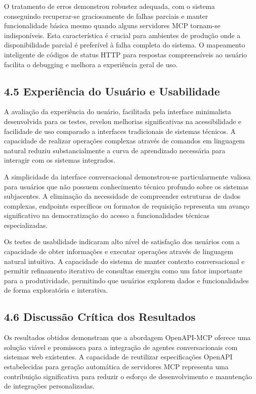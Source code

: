 \documentclass[
]{article}
\begin{document}
O tratamento de erros demonstrou robustez adequada, com o sistema
conseguindo recuperar-se graciosamente de falhas parciais e manter
funcionalidade básica mesmo quando alguns servidores MCP tornam-se
indisponíveis. Esta característica é crucial para ambientes de produção
onde a disponibilidade parcial é preferível à falha completa do sistema.
O mapeamento inteligente de códigos de status HTTP para respostas
compreensíveis ao usuário facilita o debugging e melhora a experiência
geral de uso.

\subsection{4.5 Experiência do Usuário e
Usabilidade}\label{experiuxeancia-do-usuuxe1rio-e-usabilidade}

A avaliação da experiência do usuário, facilitada pela interface
minimalista desenvolvida para os testes, revelou melhorias
significativas na acessibilidade e facilidade de uso comparado a
interfaces tradicionais de sistemas técnicos. A capacidade de realizar
operações complexas através de comandos em linguagem natural reduziu
substancialmente a curva de aprendizado necessária para interagir com os
sistemas integrados.

A simplicidade da interface conversacional demonstrou-se particularmente
valiosa para usuários que não possuem conhecimento técnico profundo
sobre os sistemas subjacentes. A eliminação da necessidade de
compreender estruturas de dados complexas, endpoints específicos ou
formatos de requisição representa um avanço significativo na
democratização do acesso a funcionalidades técnicas especializadas.

Os testes de usabilidade indicaram alto nível de satisfação dos usuários
com a capacidade de obter informações e executar operações através de
linguagem natural intuitiva. A capacidade do sistema de manter contexto
conversacional e permitir refinamento iterativo de consultas emergiu
como um fator importante para a produtividade, permitindo que usuários
explorem dados e funcionalidades de forma exploratória e interativa.

\subsection{4.6 Discussão Crítica dos
Resultados}\label{discussuxe3o-cruxedtica-dos-resultados}

Os resultados obtidos demonstram que a abordagem OpenAPI-MCP oferece uma
solução viável e promissora para a integração de agentes conversacionais
com sistemas web existentes. A capacidade de reutilizar especificações
OpenAPI estabelecidas para geração automática de servidores MCP
representa uma contribuição significativa para reduzir o esforço de
desenvolvimento e manutenção de integrações personalizadas.
\end{document}
